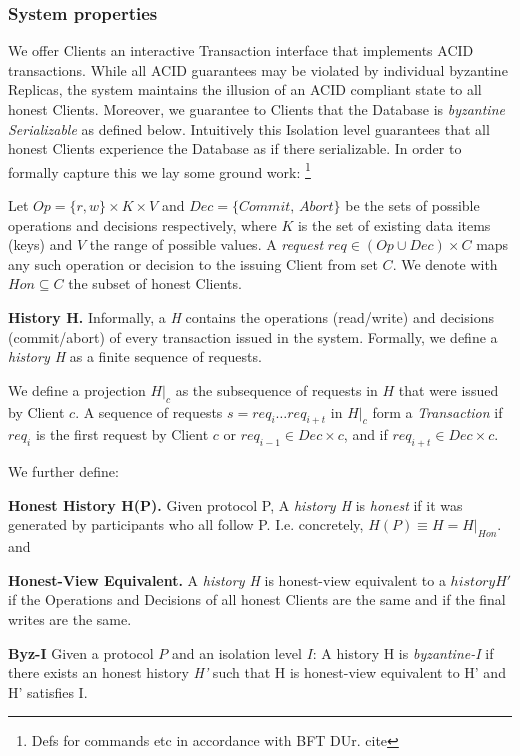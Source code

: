\subsubsection{System properties}
We offer Clients an interactive Transaction interface that implements ACID transactions. While all ACID guarantees may be violated by individual byzantine Replicas, the system maintains the illusion of an ACID compliant state to all honest Clients.
Moreover, we guarantee to Clients that the Database is \textit{byzantine Serializable} as defined below. Intuitively this Isolation level guarantees that all honest Clients experience the Database as if there serializable. In order to formally capture this we lay some ground work: \footnote{Defs for commands etc in accordance with BFT DUr. cite}

Let $Op =  \{r, w\} \times K \times V $ and $Dec = \{Commit, \,Abort\}$ be the sets of possible operations and decisions respectively, where $K$ is the set of existing data items (keys) and $V$ the range of possible values. A \textit{request} $req \in (Op \cup Dec) \times C$ maps any such operation or decision to the issuing Client from set $C$. We denote with $Hon \subseteq C$ the subset of honest Clients. 

\textbf{History H.} Informally, a \textit{H} contains the operations (read/write) and decisions (commit/abort) of every transaction issued in the system. Formally, we define a \textit{history H} as a finite sequence of requests.

We define a projection $H|_c$ as the subsequence of requests in $H$ that were issued by Client $c$. A sequence of requests $s = req_i \dots req_{i+t}$ in $H|_c$ form a \textit{Transaction} if $req_i$ is the first request by Client $c$ or $req_{i-1} \in Dec \times c$, and if $req_{i+t} \in Dec \times c$.

We further define:

\textbf{Honest History H(P).} Given protocol P, A \textit{history H} is \textit{honest} if it was generated by participants who all follow P. I.e. concretely, $H(P) \equiv H = H|_{Hon}$.
and

\textbf{Honest-View Equivalent.} A \textit{history H} is honest-view equivalent to a $history H'$ if the Operations and Decisions of all honest Clients are the same and if the final writes are the same.

\textbf{Byz-I} Given a protocol $P$ and an isolation level $I$:
A history H is \textit{byzantine-I} if there exists an honest history \textit{H'} such that H is honest-view equivalent to H' and H' satisfies I. 

